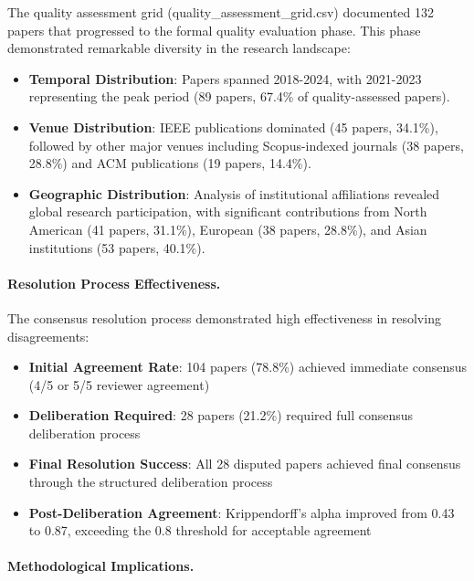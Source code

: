 \documentclass[acmsmall]{acmart}
\begin{document}
The quality assessment grid (quality\_assessment\_grid.csv) documented 132 papers that progressed to the formal quality evaluation phase. This phase demonstrated remarkable diversity in the research landscape:

\begin{itemize}
    \item \textbf{Temporal Distribution}: Papers spanned 2018-2024, with 2021-2023 representing the peak period (89 papers, 67.4\% of quality-assessed papers).
    
    \item \textbf{Venue Distribution}: IEEE publications dominated (45 papers, 34.1\%), followed by other major venues including Scopus-indexed journals (38 papers, 28.8\%) and ACM publications (19 papers, 14.4\%).
    
    \item \textbf{Geographic Distribution}: Analysis of institutional affiliations revealed global research participation, with significant contributions from North American (41 papers, 31.1\%), European (38 papers, 28.8\%), and Asian institutions (53 papers, 40.1\%).
\end{itemize}

\paragraph{Resolution Process Effectiveness.}

The consensus resolution process demonstrated high effectiveness in resolving disagreements:

\begin{itemize}
    \item \textbf{Initial Agreement Rate}: 104 papers (78.8\%) achieved immediate consensus (4/5 or 5/5 reviewer agreement)
    \item \textbf{Deliberation Required}: 28 papers (21.2\%) required full consensus deliberation process
    \item \textbf{Final Resolution Success}: All 28 disputed papers achieved final consensus through the structured deliberation process
    \item \textbf{Post-Deliberation Agreement}: Krippendorff's alpha improved from 0.43 to 0.87, exceeding the 0.8 threshold for acceptable agreement
\end{itemize}

\paragraph{Methodological Implications.}
\end{document}
